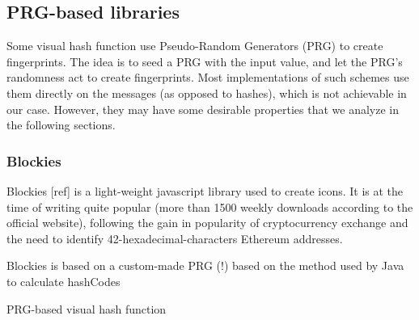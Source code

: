 \documentclass{article}
\newcommand{\bb}{\mathbb}
\newcommand{\prgb}{\bb P _\mathsf{RGB}}
\begin{document}
\subsection{PRG-based libraries}

Some visual hash function use Pseudo-Random Generators (PRG) to create fingerprints. The idea is to seed a PRG with the input value, and let the PRG's randomness act to create fingerprints. Most implementations of such schemes use them directly on the messages (as opposed to hashes), which is not achievable in our case. However, they may have some desirable properties that we analyze in the following sections.

\subsubsection{Blockies}
Blockies [ref] is a light-weight javascript library used to create icons. It is at the time of writing quite popular (more than 1500 weekly downloads according to the official website), following the gain in popularity of cryptocurrency exchange and the need to identify 42-hexadecimal-characters Ethereum addresses.

Blockies is based on a custom-made PRG (!) based on the method used by Java to calculate hashCodes 

\begin{algorithm}
\DontPrintSemicolon
\SetAlgoNoEnd
{}
\KwResult{$F \in \prgb^{m \times n}$}
\caption{PRG-based visual hash function\label{algo:prng}}

\end{algorithm}
\end{document}
